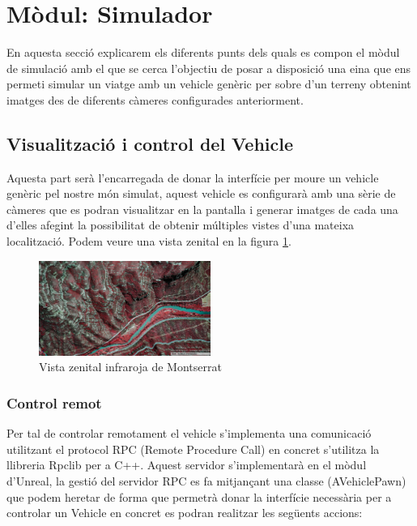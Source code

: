 \documentclass[10pt,a4paper,twocolumn,twoside]{article}
\begin{document}
\section{Mòdul: Simulador}

En aquesta secció explicarem els diferents punts dels quals es compon el mòdul de simulació amb el que se cerca l'objectiu de posar a disposició una eina que ens permeti simular un viatge amb un vehicle genèric per sobre d'un terreny obtenint imatges des de diferents càmeres configurades anteriorment.

\newpage
\subsection{Visualització i control del Vehicle}
Aquesta part serà l'encarregada de donar la interfície per moure un vehicle genèric pel nostre món simulat, aquest vehicle es configurarà amb una sèrie de càmeres que es podran visualitzar en la pantalla i generar imatges de cada una d'elles afegint la possibilitat de obtenir múltiples vistes d'una mateixa localització. Podem veure una vista zenital en la figura \ref{fig-montserratir}.

\begin{figure}[!h]
\centering
  	\includegraphics[width=0.5\textwidth]{cenitalviewir}
	\caption{Vista zenital infraroja de Montserrat}
	\label{fig-montserratir}
\end{figure}

\subsubsection{Control remot}
Per tal de controlar remotament el vehicle s'implementa una comunicació utilitzant el protocol RPC (Remote Procedure Call) en concret s'utilitza la llibreria Rpclib\cite{rpclib} per a C++. Aquest servidor s'implementarà en el mòdul d'Unreal, la gestió del servidor RPC es fa mitjançant una classe (AVehiclePawn) que podem heretar de forma que permetrà donar la interfície necessària per a controlar un Vehicle en concret es podran realitzar les següents accions:
\end{document}
